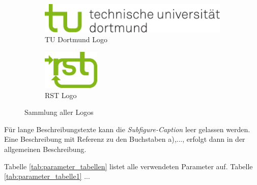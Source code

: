 \begin{figure}[htbp]
        \centering
        \begin{subfigure}[b]{0.3\textwidth}
        		\centering
                \includegraphics[width=\textwidth]{images/logos/tud_logo_rgb} 
                \caption{TU Dortmund Logo}
                \label{fig:subfigure_tud_logo}
        \end{subfigure}%
        \quad %
        \begin{subfigure}[b]{0.3\textwidth}
        		\centering
                \includegraphics[width=0.3\textwidth]{images/logos/rst_logo_rgb} %
                \caption{RST Logo}
                \label{fig:subfigure_rst_rgb}
        \end{subfigure}
        \caption{Sammlung aller Logos}
        \label{fig:logos}
\end{figure}

Für lange Beschreibungstexte kann die \textit{Subfigure-Caption} leer gelassen werden. Eine Beschreibung mit Referenz zu den Buchstaben a),..., erfolgt dann in der allgemeinen Beschreibung.

Tabelle \ref{tab:parameter_tabellen} listet alle verwendeten Parameter auf. Tabelle \ref{tab:parameter_tabelle1} ...

